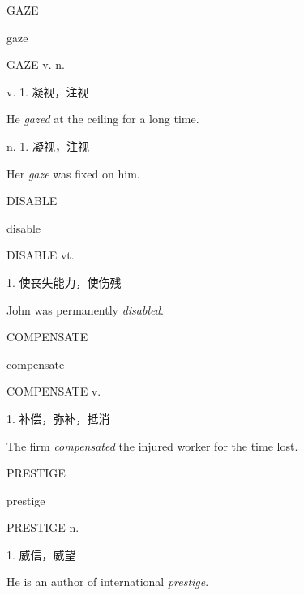 \begin{flashcard}{
GAZE

gaze
}
\begin{center}
GAZE v. n. \textipa{[geiz]}
\end{center}
v. 1. 凝视，注视

He \textit{gazed} at the ceiling for a long time.

n. 1. 凝视，注视

Her \textit{gaze} was fixed on him.

\end{flashcard}
\begin{flashcard}{
DISABLE

disable
}
\begin{center}
DISABLE vt. 
\end{center}
1. 使丧失能力，使伤残

John was permanently \textit{disabled}.

\end{flashcard}
\begin{flashcard}{
COMPENSATE

compensate
}
\begin{center}
COMPENSATE v. 
\end{center}
1. 补偿，弥补，抵消

The firm \textit{compensated} the injured worker for the time lost.

\end{flashcard}
\begin{flashcard}{
PRESTIGE

prestige
}
\begin{center}
PRESTIGE n. 
\end{center}
1. 威信，威望

He is an author of international \textit{prestige}.

\end{flashcard}
